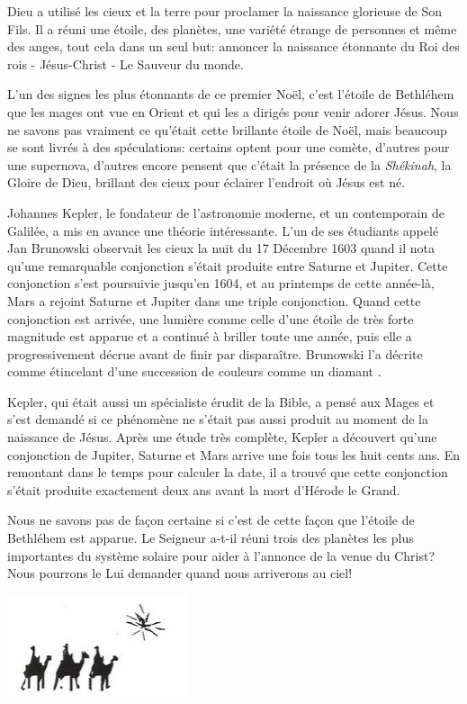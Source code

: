 


Dieu a utilisé les cieux et la terre pour proclamer la naissance glorieuse de Son Fils. Il a réuni une étoile, des planètes, une variété étrange de personnes et même des anges, tout cela dans un seul but: annoncer la naissance étonnante du Roi des rois - Jésus-Christ - Le Sauveur du monde.

L'un des signes les plus étonnants de ce premier Noël, c'est l'étoile de Bethléhem que les mages ont vue en Orient et qui les a dirigés pour venir adorer Jésus. Nous ne savons pas vraiment ce qu'était cette brillante étoile de Noël, mais beaucoup se sont livrés à des spéculations: certains optent pour une comète, d'autres pour une supernova, d'autres encore pensent que c'était la présence de la \emph{Shékinah}, la Gloire de Dieu, brillant des cieux pour éclairer l'endroit où Jésus est né.

Johannes Kepler, le fondateur de l'astronomie moderne, et un contemporain de Galilée, a mis en avance une théorie intéressante. L'un de ses étudiants appelé Jan Brunowski observait les cieux la nuit du 17 Décembre 1603 quand il nota qu'une remarquable conjonction s'était produite entre Saturne et Jupiter. Cette conjonction s'est poursuivie jusqu'en 1604, et au printemps de cette année-là, Mars a rejoint Saturne et Jupiter dans une triple conjonction. Quand cette conjonction est arrivée, une lumière comme celle d'une étoile de très forte magnitude est apparue et a continué à briller toute une année, puis elle a progressivement décrue avant de finir par disparaître. Brunowski l'a décrite comme \og étincelant d'une succession de couleurs comme un diamant \fg{}.

Kepler, qui était aussi un spécialiste érudit de la Bible, a pensé aux Mages et s'est demandé si ce phénomène ne s'était pas aussi produit au moment de la naissance de Jésus. Après une étude très complète, Kepler a découvert qu'une conjonction de Jupiter, Saturne et Mars arrive une fois tous les huit cents ans. En remontant dans le temps pour calculer la date, il a trouvé que cette conjonction s'était produite exactement deux ans avant la mort d'Hérode le Grand.

Nous ne savons pas de façon certaine si c'est de cette façon que l'étoile de Bethléhem est apparue. Le Seigneur a-t-il réuni trois des planètes les plus importantes du système solaire pour aider à l'annonce de la venue du Christ? Nous pourrons le Lui demander quand nous arriverons au ciel!


\mbox{}\hfill\includegraphics[height=3cm]{images/3kings_star.png}\hfill\mbox{}

